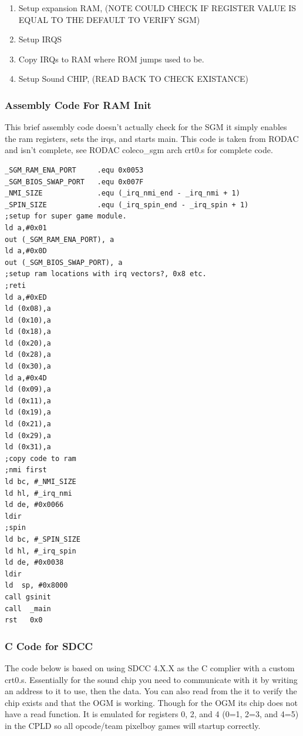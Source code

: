 \begin{enumerate}
  \item Setup expansion RAM, (NOTE COULD CHECK IF REGISTER VALUE IS EQUAL TO THE DEFAULT TO VERIFY SGM)
  \item Setup IRQS
  \item Copy IRQs to RAM where ROM jumps used to be.
  \item Setup Sound CHIP, (READ BACK TO CHECK EXISTANCE)
\end{enumerate}

\subsubsection{Assembly Code For RAM Init}

\par
This brief assembly code doesn't actually check for the SGM it simply enables the ram registers, sets the irqs, and starts main. This code is taken
from RODAC and isn't complete, see RODAC coleco\_sgm arch crt0.s for complete code.

\begin{lstlisting}[language={[x86masm]Assembler}]
_SGM_RAM_ENA_PORT     .equ 0x0053
_SGM_BIOS_SWAP_PORT   .equ 0x007F
_NMI_SIZE             .equ (_irq_nmi_end - _irq_nmi + 1)
_SPIN_SIZE            .equ (_irq_spin_end - _irq_spin + 1)
;setup for super game module.
ld a,#0x01
out (_SGM_RAM_ENA_PORT), a
ld a,#0x0D
out (_SGM_BIOS_SWAP_PORT), a
;setup ram locations with irq vectors?, 0x8 etc.
;reti
ld a,#0xED
ld (0x08),a
ld (0x10),a
ld (0x18),a
ld (0x20),a
ld (0x28),a
ld (0x30),a
ld a,#0x4D
ld (0x09),a
ld (0x11),a
ld (0x19),a
ld (0x21),a
ld (0x29),a
ld (0x31),a
;copy code to ram
;nmi first
ld bc, #_NMI_SIZE
ld hl, #_irq_nmi
ld de, #0x0066
ldir
;spin
ld bc, #_SPIN_SIZE
ld hl, #_irq_spin
ld de, #0x0038
ldir
ld	sp, #0x8000
call gsinit
call  _main
rst   0x0
\end{lstlisting}

\subsubsection{C Code for SDCC}

\par
The code below is based on using SDCC 4.X.X as the C complier with a custom crt0.s. Essentially for the sound chip you
need to communicate with it by writing an address to it to use, then the data. You can also read from the it to
verify the chip exists and that the OGM is working. Though for the OGM its chip does not have a read function. It is
emulated for registers 0, 2, and 4 (0=1, 2=3, and 4=5) in the CPLD so all opcode/team pixelboy games will startup correctly.


